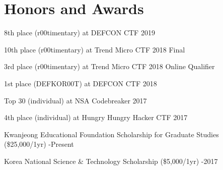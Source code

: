 \section*{Honors and Awards}
\begin{description}
  \item 8th place (r00timentary) at DEFCON CTF 2019
  
  \item 10th place (r00timentary) at Trend Micro CTF 2018 Final

  \item 3rd place (r00timentary) at Trend Micro CTF 2018 Online Qualifier

  \item 1st place (DEFKOR00T) at DEFCON CTF 2018

  \item Top 30 (individual) at NSA Codebreaker 2017

  \item 4th place (individual) at Hungry Hungry Hacker CTF 2017

  \item Kwanjeong Educational Foundation Scholarship for Graduate Studies (\$25,000/1yr) 
  -Present
  
  \item Korea National Science \& Technology Scholarship (\$5,000/1yr) 
  -2017

\end{description}
